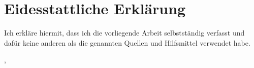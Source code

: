 \chapter*{Eidesstattliche Erklärung}
\clearscrheadfoot

Ich erkläre hiermit, dass ich die vorliegende Arbeit selbstst\"andig verfasst und daf\"ur keine
anderen als die genannten Quellen und Hilfsmittel verwendet habe.

\begin{flushleft}
\vspace{3cm}
\docAuthor
\end{flushleft}
\begin{flushleft}
\docCity{}, \docDate
\end{flushleft}